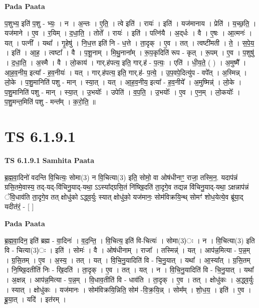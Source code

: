 \documentclass[17pt]{extarticle}
\begin{document}
\textbf{Pada Paata} \newline

प॒शुभ्य॒ इति॑ प॒शु - भ्यः॒ । न । अ॒न्तः । ए॒ति॒ । त्वे इति॑ । रायः॑ । इति॑ । यज॑मानाय । प्रेति॑ । य॒च्छ॒ति॒ । यज॑माने । ए॒व । र॒यिम् । द॒धा॒ति॒ । तोते᳚ । रायः॑ । इति॑ । पत्नि॑यै । अ॒द्‌र्धः । वै । ए॒षः । आ॒त्मनः॑ । यत् । पत्नी᳚ । यथा᳚ । गृ॒हेषु॑ । नि॒ध॒त्त इति॑ नि - ध॒त्ते । ता॒दृक् । ए॒व । तत् । त्वष्टी॑मती । ते॒ । स॒पे॒य॒ । इति॑ । आ॒ह॒ । त्वष्टा᳚ । वै । प॒शू॒नाम् । मि॒थु॒नाना᳚म् । रू॒प॒कृदिति॑ रूप - कृत् । रू॒पम् । ए॒व । प॒शुषु॑ । द॒धा॒ति॒ । अ॒स्मै । वै । लो॒काय॑ । गार्.ह॑पत्य॒ इति॒ गार्.ह॑ - प॒त्यः॒ । एति॑ । धी॒य॒ते॒ ( ) । अ॒मुष्मै᳚ । आ॒ह॒व॒नीय॒ इत्या᳚ - ह॒व॒नीयः॑ । यत् । गार्.ह॑पत्य॒ इति॒ गार्.ह॑- प॒त्ये॒ । उ॒प॒वपे॒दित्यु॑प - वपे᳚त् । अ॒स्मिन्न् । लो॒के । प॒शु॒मानिति॑ पशु - मान् । स्या॒त् । यत् । आ॒ह॒व॒नीय॒ इत्या᳚ - ह॒व॒नीये᳚ । अ॒मुष्मिन्न्॑ । लो॒के । प॒शु॒मानिति॑ पशु - मान् । स्या॒त् । उ॒भयोः᳚ । उपेति॑ । व॒प॒ति॒ । उ॒भयोः᳚ । ए॒व । ए॒न॒म् । लो॒कयोः᳚ । प॒शु॒मन्त॒मिति॑ पशु - मन्त᳚म् । क॒रो॒ति॒ ॥  \newline




\section*{ TS 6.1.9.1 }

\textbf{TS 6.1.9.1 } \newline
\textbf{Samhita Paata} \newline

ब्र॒ह्म॒वा॒दिनो॑ वदन्ति वि॒चित्यः॒ सोमा(3) न वि॒चित्या(3) इति॒ सोमो॒ वा ओष॑धीनाꣳ॒॒ राजा॒ तस्मि॒न॒. यदाप॑न्नं ग्रसि॒तमे॒वास्य॒ तद्-यद्-वि॑चिनु॒याद्-यथा॒ ऽऽस्या᳚द्ग्रसि॒तं नि॑ष्खि॒दति॑ ता॒दृगे॒व तद्यन्न वि॑चिनु॒याद्-यथा॒ ऽक्षन्नाप॑न्नं ॅवि॒धाव॑ति ता॒दृगे॒व तत् क्षोधु॑को ऽद्ध्व॒र्युः स्यात् क्षोधु॑को॒ यज॑मानः॒ सोम॑विक्रयि॒न्थ् सोमꣳ॑ शोध॒येत्ये॒व ब्रू॑या॒द् यदीत॑रं॒ - [  ] \newline

\textbf{Pada Paata} \newline

ब्र॒ह्म॒वा॒दिन॒ इति॑ ब्रह्म - वा॒दिनः॑ । व॒द॒न्ति॒ । वि॒चित्य॒ इति॑ वि-चित्यः॑ । सोमा(3)ः । न । वि॒चित्या(3) इति वि - चित्या(3)ः । इति॑ । सोमः॑ । वै । ओष॑धीनाम् । राजा᳚ । तस्मिन्न्॑ । यत् । आप॑न्न॒मित्या - प॒न्न॒म् । ग्र॒सि॒तम् । ए॒व । अ॒स्य॒ । तत् । यत् । वि॒चि॒नु॒यादिति॑ वि - चि॒नु॒यात् । यथा᳚ । आ॒स्या᳚त् । ग्र॒सि॒तम् । नि॒ष्खि॒दतीति॑ निः -   खि॒दति॑ । ता॒दृक् । ए॒व । तत् । यत् । न । वि॒चि॒नु॒यादिति॑ वि - चि॒नु॒यात् । यथा᳚ । अ॒क्षन्न् । आप॑न्न॒मित्या - प॒न्न॒म् । वि॒धाव॒तीति॑ वि - धाव॑ति । ता॒दृक् । ए॒व । तत् । क्षोधु॑कः । अ॒द्ध्व॒र्युः । स्यात् । क्षोधु॑कः । यज॑मानः । सोम॑विक्रयि॒न्निति॒ सोम॑ -वि॒क्र॒यि॒न्न् । सोम᳚म् । शो॒ध॒य॒ । इति॑ । ए॒व । ब्रू॒या॒त् । यदि॑ । इत॑रम् ।  \newline
\end{document}
